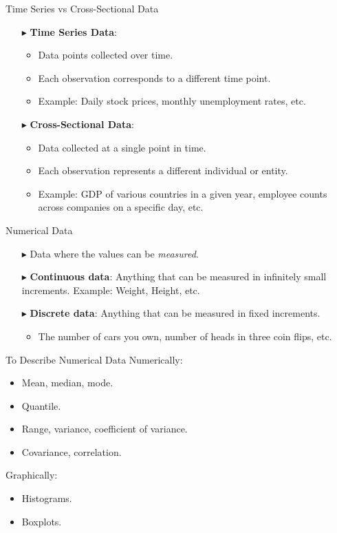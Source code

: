 \documentclass[12pt]{beamer}
\begin{document}
\begin{frame}{Time Series vs Cross-Sectional Data}
	
	\begin{itemize}
		\item[$\blacktriangleright$] \textbf{Time Series Data}:
		\begin{itemize}
			\item Data points collected over time.
			\item Each observation corresponds to a different time point.
			\item Example: Daily stock prices, monthly unemployment rates, etc.
		\end{itemize}
		
		\vspace{0.3cm}
		
		\item[$\blacktriangleright$] \textbf{Cross-Sectional Data}:
		\begin{itemize}
			\item Data collected at a single point in time.
			\item Each observation represents a different individual or entity.
			\item Example: GDP of various countries in a given year, employee counts across companies on a specific day, etc.
		\end{itemize}
	\end{itemize}
	
\end{frame}
\begin{frame}{Numerical Data}
	\begin{itemize}
		\item[$\blacktriangleright$] Data where the values can be {\sl measured}.
		\item[$\blacktriangleright$] {\bf Continuous data}: Anything that can be measured in infinitely small increments. Example: Weight, Height, etc.
		\item[$\blacktriangleright$] {\bf Discrete data}: Anything that can be measured in fixed increments.
		\begin{itemize}
		\item The number of cars you own, number of heads in three coin flips, etc.
	    \end{itemize}
	\end{itemize}
\end{frame}
\begin{frame}{To Describe Numerical Data}
Numerically:
		\begin{itemize}
			\item Mean, median, mode.
			\item Quantile.
			\item Range, variance, coefficient of variance.
			\item Covariance, correlation.
		\end{itemize}
Graphically:
\begin{itemize}
	\item Histograms.
	\item Boxplots.
\end{itemize}
\end{frame}
\end{document}

